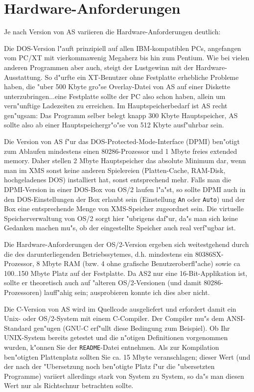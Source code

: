 \documentclass[12pt,a4paper,twoside]{report}
\newcommand{\tty}[1]{{\tt #1}}
\begin{document}

\section{Hardware-Anforderungen}

Je nach Version von AS variieren die Hardware-Anforderungen deutlich:

Die DOS-Version  l"auft prinzipiell auf allen
IBM-kompatiblen PCs, angefangen vom PC/XT mit vierkommawenig Megaherz bis
hin zum Pentium.  Wie bei vielen anderen Programmen aber auch, steigt der
Lustgewinn mit der Hardware-Ausstattung.  So d"urfte ein XT-Benutzer ohne
Festplatte erhebliche Probleme haben, die "uber 500 Kbyte gro"se
Overlay-Datei von AS auf einer Diskette unterzubringen...eine Festplatte
sollte der PC also schon haben, allein um vern"unftige Ladezeiten zu
erreichen.  Im Hauptspeicherbedarf ist AS recht gen"ugsam: Das Programm
selber belegt knapp 300 Kbyte Hauptspeicher, AS sollte also ab einer
Hauptspeichergr"o"se von 512 Kbyte ausf"uhrbar sein.

Die Version von AS f"ur das 
DOS-Protected-Mode-Interface (DPMI) ben"otigt zum Ablaufen mindestens
einen 80286-Prozessor und 1 Mbyte freies extended memory.  Daher stellen 2
Mbyte Hauptspeicher das absolute Minimum dar, wenn man im XMS sonst keine
anderen Spielereien (Platten-Cache, RAM-Disk, hochgeladenes DOS)
installiert hat, sonst entsprechend mehr.  Falls man die DPMI-Version in
einer DOS-Box von OS/2 laufen l"a"st, so sollte DPMI auch in den
DOS-Einstellungen der Box erlaubt sein (Einstellung \tty{An} oder
\tty{Auto}) und der Box eine entsprechende Menge von XMS-Speicher
zugeordnet sein.  Die virtuelle Speicherverwaltung von OS/2 sorgt hier
"ubrigens daf"ur, da"s man sich keine Gedanken machen mu"s, ob der
eingestellte Speicher auch real verf"ugbar ist.

Die Hardware-Anforderungen der  OS/2-Version ergeben sich
weitestgehend durch die des darunterliegenden Betriebssytemes, d.h.
mindestens ein 80386SX-Prozessor, 8 Mbyte RAM (bzw. 4 ohne grafische
Benutzeroberfl"ache) sowie ca 100..150 Mbyte Platz auf der Festplatte.  Da
AS2 nur eine 16-Bit-Applikation ist, sollte er theoretisch auch auf
"alteren OS/2-Versionen (und damit 80286-Prozessoren) lauff"ahig sein;
ausprobieren konnte ich dies aber nicht.

Die C-Version  von AS wird im Quellcode ausgeliefert
und erfordert damit ein Unix- oder OS/2-System mit einem C-Compiler.
Der Compiler mu"s dem ANSI-Standard gen"ugen (GNU-C erf"ullt diese
Bedingung zum Beispiel).  Ob Ihr UNIX-System bereits getestet und die
n"otigen Definitionen vorgenommen wurden, k"onnen Sie der \tty{README}-Datei
entnehmen.  Als zur Kompilation ben"otigten Plattenplatz sollten Sie
ca. 15 Mbyte veranschlagen; dieser Wert (und der nach der "Ubersetzung
noch ben"otigte Platz f"ur die "ubersetzten Programme) variiert
allerdings stark von System zu System, so da"s man diesen Wert nur als
Richtschnur betrachten sollte.
\end{document}
